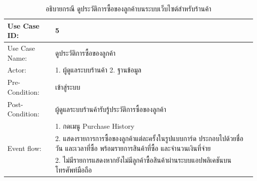 \begin{table}[htbp]
  \centering
  \caption{อธิบายกรณี ดูประวัติการซื้อของลูกค้าบนระบบเว็บไซต์สำหรับร้านค้า}
  \label{tab:example}
  \begin{tabularx}{\textwidth}{|p{3cm}|X|}
    \hline
    \multirow{1}{3cm}{Use Case ID:}      & 5                                                                                                        \\
    \hline
    \multirow{1}{3cm}{Use Case Name:}    & ดูประวัติการซื้อของลูกค้า                                                                                       \\
    \hline
    \multirow{1}{3cm}{Actor:}            & 1. ผู้ดูแลระบบร้านค้า  2. ฐานข้อมูล                                                                             \\
    \hline
    \multirow{1}{3cm}{Pre-Condition:}    & เข้าสู่ระบบ                                                                                                 \\
    \hline
    \multirow{1}{3cm}{Post-Condition:}   & ผู้ดูแลระบบร้านค้ารับรู้ประวัติการซื้อของลูกค้า                                                                        \\
    \hline
    \multirow{3}{3cm}{Event flow:}       & 1. กดเมนู Purchase History                                                                                \\
                                         & 2. แสดงรายการการซื้อของลูกค้าแต่ละครั้งในรูปแบบการ์ด ประกอบไปด้วยชื่อ วัน และเวลาที่ซื้อ พร้อมรายการสินค้าที่ซื้อ และจำนวนเงินที่จ่าย \\
    \hline
    \multirow{1}{3cm}{Alternative flow:} & 2. ไม่มีรายการแสดงหากยังไม่มีลูกค้าซื้อสินค้าผ่านระบบแอปพลิเคชันบนโทรศัพท์มือถือ                                           \\
    \hline
  \end{tabularx}
\end{table}

